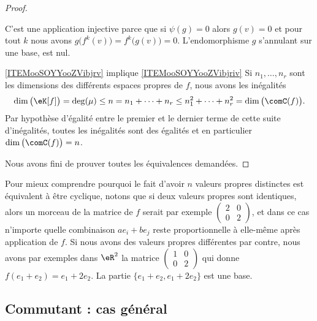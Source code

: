 \begin{proof}
\begin{subproof}
            C'est une application injective parce que si \( \psi(g)=0\) alors \( g(v)=0\) et pour tout \( k\) nous avons \( g\big( f^k(v) \big)=f^k\big( g(v) \big)=0\). L'endomorphisme \( g\) s'annulant sur une base, est nul.
        \item[\ref{ITEMooSOYYooZVibjrv} implique \ref{ITEMooSOYYooZVibjriv}]
            Si \( n_1,\ldots, n_r\) sont les dimensions des différents espaces propres de \( f\), nous avons les inégalités
            \begin{equation}
                \dim\big( \eK[f] \big)=\deg(\mu)\leq n=n_1+\cdots +n_r\leq n_1^2+\cdots +n_r^2=\dim\big( \comC(f) \big).
            \end{equation}
            Par hypothèse d'égalité entre le premier et le dernier terme de cette suite d'inégalités, toutes les inégalités sont des égalités et en particulier \( \dim\big( \comC(f) \big)=n\).
        \end{subproof}
            Nous avons fini de prouver toutes les équivalences demandées.
\end{proof}

\begin{example}
    Pour mieux comprendre pourquoi le fait d'avoir \( n\) valeurs propres distinctes est équivalent à être cyclique, notons que si deux valeurs propres sont identiques, alors un morceau de la matrice de \( f\) serait par exemple \( \begin{pmatrix}
          2  &   0    \\ 
        0    &   2    
    \end{pmatrix}\), et dans ce cas n'importe quelle combinaison \( ae_i+be_j\) reste proportionnelle à elle-même après application de \( f\). Si nous avons des valeurs propres différentes par contre, nous avons par exemples dans \( \eR^2\) la matrice \( \begin{pmatrix}
        1    &   0    \\ 
        0    &   2    
    \end{pmatrix}\) qui donne \( f(e_1+e_2)=e_1+2e_2\). La partie \( \{ e_1+e_2,e_1+2e_2 \}\) est une base.
\end{example}

\subsection{Commutant : cas général}

